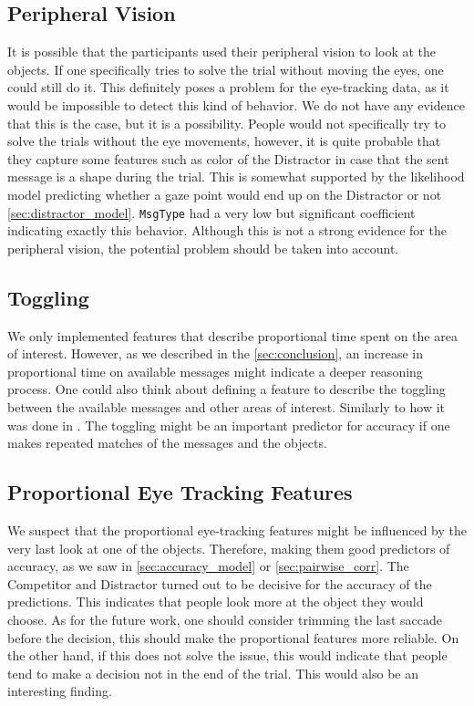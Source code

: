 \subsection{Peripheral Vision}
\label{sec:general-discussion:attention-and-eye-tracking}
It is possible that the participants used their peripheral vision to look at the objects. If one specifically tries to solve the trial without moving the eyes, one could still do it. This definitely poses a problem for the eye-tracking data, as it would be impossible to detect this kind of behavior. We do not have any evidence that this is the case, but it is a possibility. People would not specifically try to solve the trials without the eye movements, however, it is quite probable that they capture some features such as color of the Distractor in case that the sent message is a shape during the trial. This is somewhat supported by the likelihood model predicting whether a gaze point would end up on the Distractor or not \autoref{sec:distractor_model}. \texttt{MsgType} had a very low but significant coefficient indicating exactly this behavior. Although this is not a strong evidence for the peripheral vision, the potential problem should be taken into account.


\subsection{Toggling}
\label{sec:general-discussion:toggling}
We only implemented features that describe proportional time spent on the area of interest. However, as we described in the \autoref{sec:conclusion}, an increase in proportional time on available messages might indicate a deeper reasoning process. One could also think about defining a feature to describe the toggling between the available messages and other areas of interest. Similarly to how it was done in \cite{Vigneau_2006}. The toggling might be an important predictor for accuracy if one makes repeated matches of the messages and the objects. 

\subsection{Proportional Eye Tracking Features}
\label{sec:general-discussion:proportional-eye-tracking-features}
We suspect that the proportional eye-tracking features might be influenced by the very last look at one of the objects. Therefore, making them good predictors of accuracy, as we saw in \autoref{sec:accuracy_model} or \autoref{sec:pairwise_corr}. The Competitor and Distractor turned out to be decisive for the accuracy of the predictions. This indicates that people look more at the object they would choose. As for the future work, one should consider trimming the last saccade before the decision, this should make the proportional features more reliable. On the other hand, if this does not solve the issue, this would indicate that people tend to make a decision not in the end of the trial. This would also be an interesting finding.

